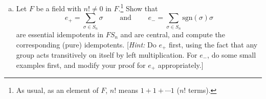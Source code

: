 \documentclass[11pt, reqno]{amsart}
\theoremstyle{plain}
\theoremstyle{definition}
\theoremstyle{example}
\def\sgn{\mathrm{sgn}}
\begin{document}
\begin{enumerate}[1.]
\begin{enumerate}[(a)]
\begin{enumerate}[(i)]
\begin{proof}
Since $R$ is commutative and $\kappa_g \in Z(RG)$ for all $g$, we have,
\begin{align*}
ar_1\kappa_1 + \cdots + ar_{\ell}\kappa_{\ell} &= r_1\kappa_1a + \cdots + r_{\ell}\kappa_{\ell}a\\
&= (r_1\kappa_1 + \cdots + r_{\ell}\kappa_{\ell})a
\end{align*}

As a result, $(r_1\kappa_1 + \cdots + r_{\ell}\kappa_{\ell}) \in Z(RG)$.
\end{proof}

\item Conversely, show that for $a = \sum_{g \in G} s_g g \in RG$, if $h a h^-1 = a$ for all $h \in G$, then $s_g = s_{g'}$ whenever $g$ is conjugate to $g$ (i.e.\ the coefficients are constant across conjugacy classes). {[Hint: Start one at a time: if $h a h^-1 = a$, then compare both sides to get $s_g = s_{h^{-1}gh}$. Try on your examples in part (b) to get started if you need help.]}

\begin{proof}

\end{proof}

\item Let $a \in RG$. Show that if $ha = ah$ for all $h \in G$, then $ba = ab$ for all $b \in RG$. 

\begin{proof}
Let $a \in RG$ and suppose $ha = ah$ for all $h \in G$. Let $b \in RG$ and let us write $b$ as  $b = b_1g_1 + b_2g_2 + \cdots + b_ng_n$ for $b_i \in R$, $g_j \in G$ with $1 \leq i, j \leq n$. Let us also write $a \in RG$ as $a = a_1g_1 + a_2g_2 + \cdots + a_ng_n$ for $a_i \in R$, $g_j \in G$ with $1 \leq i, j \leq n$.  Then we have,
\begin{align*}
ba &= (b_1g_1 + b_2g_2 + \cdots + b_ng_n) \cdot (a_1g_1 + a_2g_2 + \cdots + a_ng_n)\\
&= \sum_{g_i g_j = g_k} a_i b_jg_k
\end{align*}

We have that $ha = ah$ for all $h \in G$ and that 
\end{proof}

\end{enumerate}
\item Let $F$ be a field with $n! \ne 0$ in $F$.\footnote{As usual, as an element of $F$, $n!$ means $1+ 1+ \cdots 1$ ($n!$ terms).} Show that 
$$e_+ = \sum_{\sigma \in S_n} \sigma \qquad \text{ and } \qquad e_- = \sum_{\sigma \in S_n} \sgn(\sigma) \sigma$$ are essential idempotents in $F S_n$ and are central, and compute the corresponding (pure) idempotents. {[\emph{Hint:} Do $e_+$ first, using the fact that any group acts transitively on itself by left multiplication. For $e_-$, do some small examples first, and modify your proof for $e_+$ appropriately.]}
\end{enumerate}


\end{enumerate}
\end{document}
